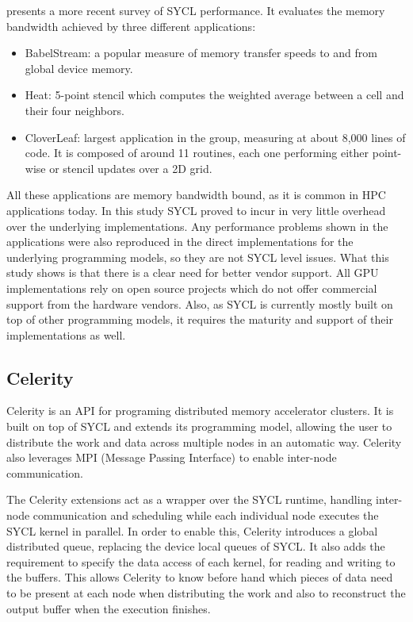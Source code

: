 \cite{sycl_hpc_applications} presents a more recent survey of SYCL performance. It evaluates the memory bandwidth achieved by three different applications:
\begin{itemize}
    \item BabelStream: a popular measure of memory transfer speeds to and from global device memory.
    \item Heat: 5-point stencil which computes the weighted average between a cell and their four neighbors.
    \item CloverLeaf: largest application in the group, measuring at about 8,000 lines of code. It is composed of around 11 routines, each one performing either point-wise or stencil updates over a 2D grid.
\end{itemize}
All these applications are memory bandwidth bound, as it is common in HPC applications today.
In this study SYCL proved to incur in very little overhead over the underlying implementations. Any performance problems shown in the applications were also reproduced in the direct implementations for the underlying programming models, so they are not SYCL level issues. What this study shows is that there is a clear need for better vendor support. All GPU implementations rely on open source projects which do not offer commercial support from the hardware vendors. Also, as SYCL is currently mostly built on top of other programming models, it requires the maturity and support of their implementations as well.

\subsection{Celerity}
Celerity \cite{celerity} is an API for programing distributed memory accelerator clusters. It is built on top of SYCL and extends its programming model, allowing the user to distribute the work and data across multiple nodes in an automatic way. Celerity also leverages MPI (Message Passing Interface) \cite{mpi} to enable inter-node communication.

The Celerity extensions act as a wrapper over the SYCL runtime, handling inter-node communication and scheduling while each individual node executes the SYCL kernel in parallel. In order to enable this, Celerity introduces a global distributed queue, replacing the device local queues of SYCL. It also adds the requirement to specify the data access of each kernel, for reading and writing to the buffers. This allows Celerity to know before hand which pieces of data need to be present at each node when distributing the work and also to reconstruct the output buffer when the execution finishes.

